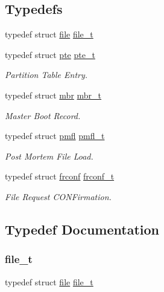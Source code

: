 \subsection*{Typedefs}
\begin{DoxyCompactItemize}
\item 
typedef struct \hyperlink{a00308}{file} \hyperlink{a00191_aa5445a6474a23ee3e7756d432dfa4ba1_aa5445a6474a23ee3e7756d432dfa4ba1}{file\+\_\+t}
\item 
typedef struct \hyperlink{a00312}{pte} \hyperlink{a00191_aeef6bb6b6bbfd4d912338e1e5c6938a5_aeef6bb6b6bbfd4d912338e1e5c6938a5}{pte\+\_\+t}
\begin{DoxyCompactList}\small\item\em Partition Table Entry. \end{DoxyCompactList}\item 
typedef struct \hyperlink{a00316}{mbr} \hyperlink{a00191_adb8ab3f846ea25ce3271bfabb17fc767_adb8ab3f846ea25ce3271bfabb17fc767}{mbr\+\_\+t}
\begin{DoxyCompactList}\small\item\em Master Boot Record. \end{DoxyCompactList}\item 
typedef struct \hyperlink{a00320}{pmfl} \hyperlink{a00191_a02f7eedc7de6c770b6b29a62905fc61d_a02f7eedc7de6c770b6b29a62905fc61d}{pmfl\+\_\+t}
\begin{DoxyCompactList}\small\item\em Post Mortem File Load. \end{DoxyCompactList}\item 
typedef struct \hyperlink{a00324}{frconf} \hyperlink{a00191_a752f1bef3c13b98d682fddc44a9e47c8_a752f1bef3c13b98d682fddc44a9e47c8}{frconf\+\_\+t}
\begin{DoxyCompactList}\small\item\em File Request C\+O\+N\+Firmation. \end{DoxyCompactList}\end{DoxyCompactItemize}


\subsection{Typedef Documentation}
\mbox{\label{a00191_aa5445a6474a23ee3e7756d432dfa4ba1_aa5445a6474a23ee3e7756d432dfa4ba1}} 
\subsubsection{\texorpdfstring{file\+\_\+t}{file\_t}}
{\footnotesize\ttfamily typedef struct \hyperlink{a00308}{file}  \hyperlink{a00191_aa5445a6474a23ee3e7756d432dfa4ba1_aa5445a6474a23ee3e7756d432dfa4ba1}{file\+\_\+t}}

